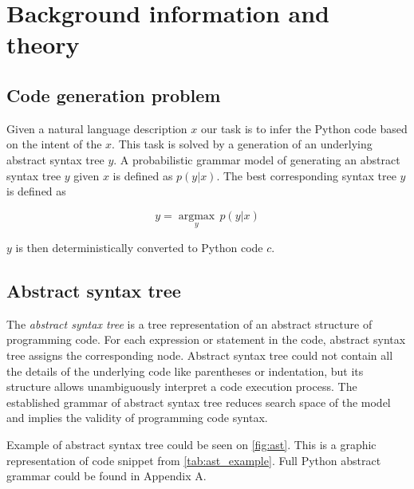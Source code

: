 
\chapter{Background information and theory} %

\label{Chapter2} %

\section{Code generation problem}

Given a natural language description $x$ our task is to infer the Python code based on the intent of the $x$. This task is solved by a generation of an underlying abstract syntax tree $y$. A probabilistic grammar model of generating an abstract syntax tree $y$ given $x$ is defined as $p(y|x)$. The best corresponding syntax tree $y$ is defined as

\begin{equation}
y=\underset{y}{\operatorname{argmax}}\, p(y|x)
\label{eqn:main_problem}
\end{equation}

$y$ is then deterministically converted to Python code $c$. 

\section{Abstract syntax tree}
The \emph{abstract syntax tree} is a tree representation of an abstract structure of programming code. For each expression or statement in the code, abstract syntax tree assigns the corresponding node. Abstract syntax tree could not contain all the details of the underlying code like parentheses or  indentation, but its structure allows unambiguously interpret a code execution process. The established grammar of abstract syntax tree reduces search space of the model and implies the validity of programming code syntax. 

Example of abstract syntax tree could be seen on \ref{fig:ast}. This is a graphic representation of code snippet from \ref{tab:ast_example}. Full Python abstract grammar could be found in Appendix A.

